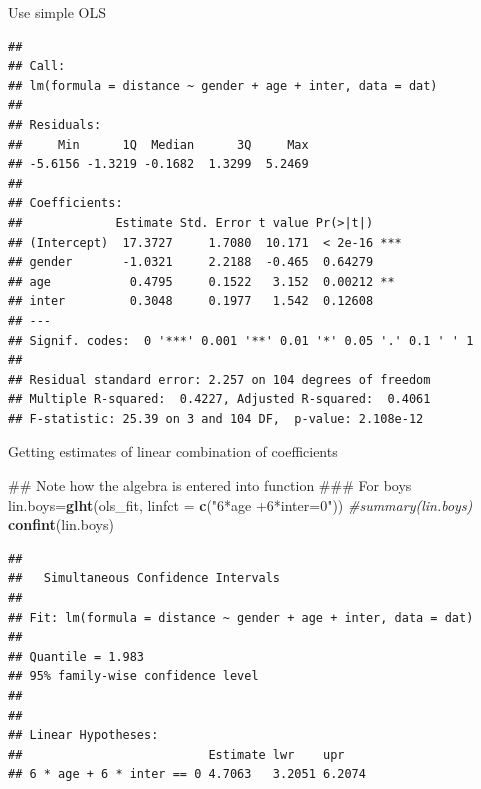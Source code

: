 \documentclass[ignorenonframetext,]{beamer}
\newenvironment{Shaded}{\begin{snugshade}}{\end{snugshade}}
\newcommand{\KeywordTok}[1]{\textcolor[rgb]{0.13,0.29,0.53}{\textbf{#1}}}
\newcommand{\DataTypeTok}[1]{\textcolor[rgb]{0.13,0.29,0.53}{#1}}
\newcommand{\StringTok}[1]{\textcolor[rgb]{0.31,0.60,0.02}{#1}}
\newcommand{\CommentTok}[1]{\textcolor[rgb]{0.56,0.35,0.01}{\textit{#1}}}
\newcommand{\OperatorTok}[1]{\textcolor[rgb]{0.81,0.36,0.00}{\textbf{#1}}}
\newcommand{\NormalTok}[1]{#1}
\begin{document}
\begin{frame}[fragile]{Use simple OLS}

\tiny

\begin{Shaded}
\end{Shaded}

\begin{verbatim}
## 
## Call:
## lm(formula = distance ~ gender + age + inter, data = dat)
## 
## Residuals:
##     Min      1Q  Median      3Q     Max 
## -5.6156 -1.3219 -0.1682  1.3299  5.2469 
## 
## Coefficients:
##             Estimate Std. Error t value Pr(>|t|)    
## (Intercept)  17.3727     1.7080  10.171  < 2e-16 ***
## gender       -1.0321     2.2188  -0.465  0.64279    
## age           0.4795     0.1522   3.152  0.00212 ** 
## inter         0.3048     0.1977   1.542  0.12608    
## ---
## Signif. codes:  0 '***' 0.001 '**' 0.01 '*' 0.05 '.' 0.1 ' ' 1
## 
## Residual standard error: 2.257 on 104 degrees of freedom
## Multiple R-squared:  0.4227, Adjusted R-squared:  0.4061 
## F-statistic: 25.39 on 3 and 104 DF,  p-value: 2.108e-12
\end{verbatim}

\end{frame}

\begin{frame}[fragile]{Getting estimates of linear combination of
coefficients}

\tiny

\begin{Shaded}
\begin{Highlighting}[]
\NormalTok{## Note how the algebra is entered into function}
\NormalTok{### For boys}
\NormalTok{lin.boys=}\KeywordTok{glht}\NormalTok{(ols_fit, }\DataTypeTok{linfct =} \KeywordTok{c}\NormalTok{(}\StringTok{"6*age +6*inter=0"}\NormalTok{))}
\CommentTok{#summary(lin.boys)}
\KeywordTok{confint}\NormalTok{(lin.boys)  }
\end{Highlighting}
\end{Shaded}

\begin{verbatim}
## 
##   Simultaneous Confidence Intervals
## 
## Fit: lm(formula = distance ~ gender + age + inter, data = dat)
## 
## Quantile = 1.983
## 95% family-wise confidence level
##  
## 
## Linear Hypotheses:
##                          Estimate lwr    upr   
## 6 * age + 6 * inter == 0 4.7063   3.2051 6.2074
\end{verbatim}

\end{frame}
\end{document}
